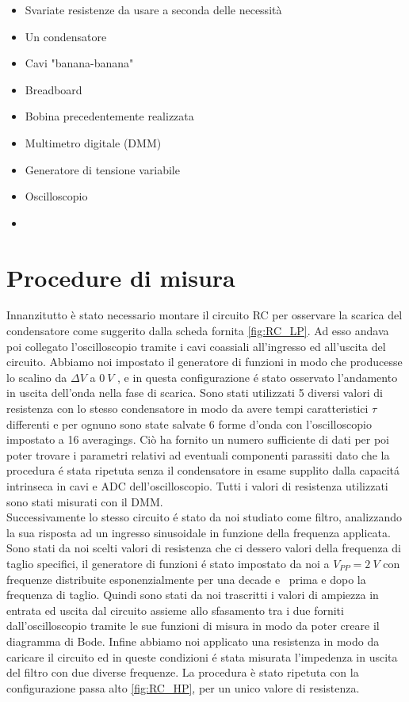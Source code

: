 \documentclass{article}
\begin{document}
\begin{itemize}
  \item Svariate resistenze da usare a seconda delle necessità
  \item Un condensatore
  \item Cavi "banana-banana"
  \item Breadboard
  \item Bobina precedentemente realizzata
  \item Multimetro digitale (DMM)
  \item Generatore di tensione variabile
  \item Oscilloscopio
  \item %
\end{itemize}

\newpage

\section{Procedure di misura}

Innanzitutto è stato necessario montare il circuito RC per osservare la scarica del condensatore come suggerito dalla scheda fornita \ref{fig:RC_LP}. Ad esso andava poi collegato l'oscilloscopio tramite i cavi coassiali all'ingresso ed all'uscita del circuito. Abbiamo noi impostato il generatore di funzioni in modo che  producesse lo scalino da $\Delta V$ a $0\ V$ , e in questa configurazione \'e stato osservato l'andamento in uscita dell'onda nella fase di scarica. Sono stati utilizzati 5 diversi valori di resistenza con lo stesso condensatore in modo da avere tempi caratteristici $\tau$ differenti e per ognuno sono state salvate 6 forme d'onda con l'oscilloscopio impostato a 16 averagings. Ciò ha fornito un numero sufficiente di dati per poi poter trovare i parametri relativi ad eventuali componenti parassiti dato che la procedura \'e stata ripetuta senza il condensatore in esame supplito dalla capacit\'a intrinseca in cavi e ADC dell'oscilloscopio. Tutti i valori di resistenza utilizzati sono stati misurati con il DMM. \\

Successivamente lo stesso circuito \'e stato da noi studiato come filtro, analizzando la sua risposta ad un ingresso sinusoidale in funzione della frequenza applicata. Sono stati da noi scelti valori di resistenza che ci dessero valori della frequenza di taglio specifici, il generatore di funzioni \'e stato impostato da noi a $V_{PP} = 2 \ V$ %
con frequenze distribuite esponenzialmente per una decade e \textonehalf \ prima e dopo la frequenza di taglio. Quindi sono stati da noi trascritti i valori di ampiezza in entrata ed uscita dal circuito assieme allo sfasamento tra i due forniti dall'oscilloscopio tramite le sue funzioni di misura in modo da poter creare il diagramma di Bode. Infine abbiamo noi applicato una resistenza in modo da caricare il circuito ed in queste condizioni \'e stata misurata l'impedenza in uscita del filtro con due diverse frequenze. La procedura è stato ripetuta con la configurazione passa alto \ref{fig:RC_HP}, per un unico valore di resistenza. \\
\end{document}
